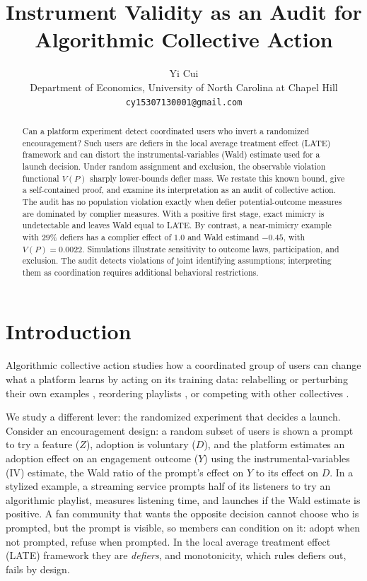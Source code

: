 \documentclass{article}
\title{Instrument Validity as an Audit for Algorithmic Collective Action}
\author{%
  Yi Cui\\
  Department of Economics, University of North Carolina at Chapel Hill\\
  \texttt{cy15307130001@gmail.com}
}
\theoremstyle{remark}
\begin{document}
\maketitle

\begin{abstract}
Can a platform experiment detect coordinated users who invert a randomized
encouragement? Such users are defiers in the local average treatment effect
(LATE) framework and can distort the instrumental-variables (Wald) estimate
used for a launch decision. Under random assignment and exclusion, the
observable violation functional $V(P)$ sharply lower-bounds defier mass.
We restate this known bound, give a self-contained proof, and examine its
interpretation as an audit of collective action. The audit has no population
violation exactly when defier potential-outcome measures are dominated by
complier measures. With a positive first stage, exact mimicry is undetectable
and leaves Wald equal to LATE. By contrast, a near-mimicry example with $29\%$ defiers
has a complier effect of $1.0$ and Wald estimand $-0.45$, with $V(P)=0.0022$.
Simulations illustrate sensitivity to outcome laws, participation, and
exclusion. The audit detects violations of joint identifying assumptions;
interpreting them as coordination requires additional behavioral restrictions.
\end{abstract}

\section{Introduction}

Algorithmic collective action studies how a coordinated group of users can
change what a platform learns by acting on its training data: relabelling or
perturbing their own examples \citep{hardt2023aca}, reordering playlists
\citep{baumann2024playlists}, or competing with other collectives
\citep{karan2025two,battiloro2025multiple}.

We study a different lever: the randomized experiment that decides a launch.
Consider an encouragement design: a random subset of users
is shown a prompt to try a feature ($Z$), adoption is voluntary ($D$), and the
platform estimates an adoption effect on an engagement outcome ($Y$) using the
instrumental-variables (IV) estimate, the Wald ratio of the prompt's effect on
$Y$ to its effect on $D$. In a stylized example, a streaming service prompts half of
its listeners to try an algorithmic playlist, measures listening time, and
launches if the Wald estimate is positive. A fan community that wants the
opposite decision \citep[cf.][]{baumann2024playlists} cannot choose who is
prompted, but the prompt is visible, so members can condition on it: adopt when
not prompted, refuse when prompted. In the local average treatment effect
(LATE) framework \citep{imbens1994,angrist1996} they are \emph{defiers}, and
monotonicity, which rules defiers out, fails by design.
\end{document}
